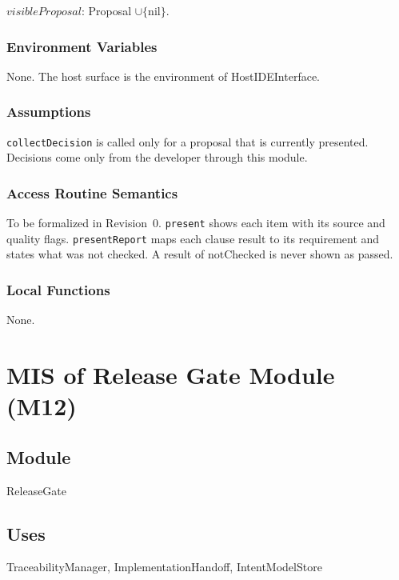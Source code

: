 \documentclass[12pt, titlepage]{article}
\begin{document}
$visibleProposal$: Proposal $\cup \{\mathrm{nil}\}$.

\subsubsection{Environment Variables}

None. The host surface is the environment of HostIDEInterface.

\subsubsection{Assumptions}

\texttt{collectDecision} is called only for a proposal that is currently
presented. Decisions come only from the developer through this module.

\subsubsection{Access Routine Semantics}

To be formalized in Revision~0. \texttt{present} shows each item with its
source and quality flags. \texttt{presentReport} maps each clause result to its
requirement and states what was not checked. A result of
$\mathrm{notChecked}$ is never shown as passed.

\subsubsection{Local Functions}

None.

\newpage
\section{MIS of Release Gate Module (M12)} \label{MISGate}

\subsection{Module}

ReleaseGate

\subsection{Uses}

TraceabilityManager, ImplementationHandoff, IntentModelStore
\end{document}
